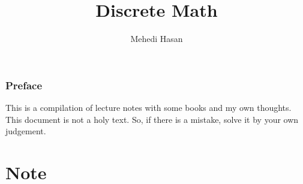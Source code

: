 \documentclass[12pt,oneside,a4paper]{book}
\theoremstyle{remark}
\theoremstyle{definition}
\begin{document}
\title{Discrete Math}
\author{Mehedi Hasan}
\maketitle
\newpage
\section*{Preface}
This is a compilation of lecture notes with some books and my own thoughts. This document is not a holy text. So, if there is a mistake, solve it by your own judgement.
\newpage
\tableofcontents
\newpage
{}
\part{Note}
    
    
\end{document}
